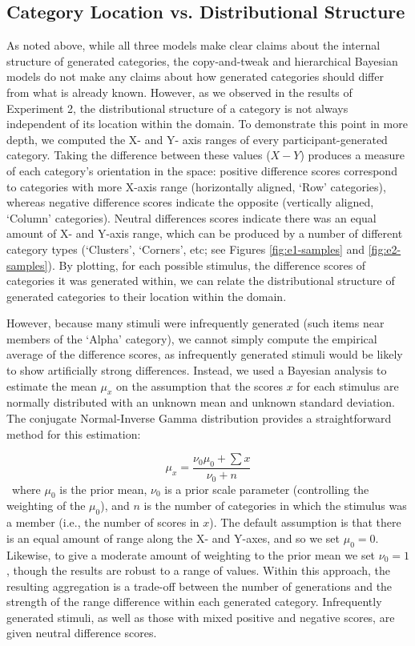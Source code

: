 \documentclass[12pt]{article}
\begin{document}
\begin{flushleft}
\subsection{Category Location vs. Distributional Structure}
\label{section:individual-diff}
As noted above, while all three models make clear claims about the internal
structure of generated categories, the copy-and-tweak and hierarchical Bayesian
models do not make any claims about how generated categories should differ from
what is already known. However, as we observed in the results of Experiment 2,
the distributional structure of a category is not always independent of its
location within the domain. To demonstrate this point in more depth, we computed
the X- and Y- axis ranges of every participant-generated category. Taking the
difference between these values ($X-Y$) produces a measure of each category's
orientation in the space: positive difference scores correspond to categories
with more X-axis range (horizontally aligned, `Row' categories), whereas
negative difference scores indicate the opposite (vertically aligned, `Column'
categories). Neutral differences scores indicate there was an equal amount of X-
and Y-axis range, which can be produced by a number of different category types
(`Clusters', `Corners', etc; see Figures \ref{fig:e1-samples} and
\ref{fig:e2-samples}). By plotting, for each possible stimulus, the difference
scores of categories it was generated within, we can relate the distributional
structure of generated categories to their location within the domain.

However, because many stimuli were infrequently generated (such items near
members of the `Alpha' category), we cannot simply compute the empirical average
of the difference scores, as infrequently generated stimuli would be likely to
show artificially strong differences. Instead, we used a Bayesian analysis to
estimate the mean $\mu_x$ on the assumption that the scores $x$ for each
stimulus are normally distributed with an unknown mean and unknown standard
deviation. The conjugate Normal-Inverse Gamma distribution provides a
straightforward method for this estimation:


\begin{equation} \mu_x = \dfrac { \nu_0 \mu_0 + \sum{x} } { \nu_0 + n }
\label{eq:rangediff-bayes}
\end{equation} \ where $\mu_0$ is the prior mean, $\nu_0$ is a prior scale
parameter (controlling the weighting of the $\mu_0$), and $n$ is the number of
categories in which the stimulus was a member (i.e., the number of scores in
$x$). The default assumption is that there is an equal amount of range along the
X- and Y-axes, and so we set $\mu_0 = 0$. Likewise, to give a moderate amount of
weighting to the prior mean we set $\nu_0 = 1$, though the results are robust to
a range of values. Within this approach, the resulting aggregation is a
trade-off between the number of generations and the strength of the range
difference within each generated category. Infrequently generated stimuli, as
well as those with mixed positive and negative scores, are given neutral
difference scores.


\end{flushleft}
\end{document}
